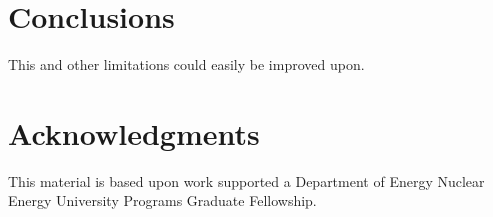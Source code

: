 \documentclass{anstrans}
\begin{document}
\section{Conclusions}


This and other limitations could easily be improved upon.  

\section{Acknowledgments}
This material is based upon work supported a Department of Energy Nuclear
Energy University Programs Graduate Fellowship.



\end{document}
